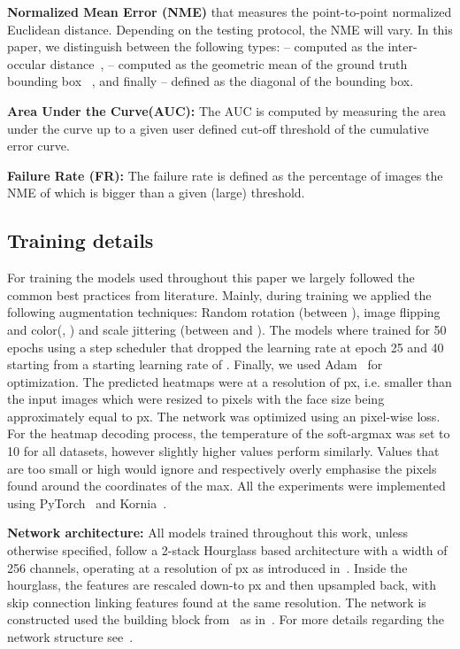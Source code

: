 \documentclass{bmvc2k}
\begin{document}
\noindent\textbf{Normalized Mean Error (NME)} that measures the point-to-point normalized Euclidean distance. Depending on the testing protocol, the NME  will vary. In this paper, we distinguish between the following types:   -- computed as the inter-occular distance~\cite{sagonas2013300},  -- computed as the geometric mean of the ground truth bounding box~\cite{bulat2017far} , and finally  -- defined as the diagonal of the bounding box.

\noindent\textbf{Area Under the Curve(AUC):} The AUC is computed by measuring the area under the curve up to a given user defined cut-off threshold of the cumulative error curve.

\noindent\textbf{Failure Rate (FR):} The failure rate is defined as the percentage of images the NME of which is bigger than a given (large) threshold.

\subsection{Training details}\label{ssec:training-details}
For training the models used throughout this paper we largely followed the common best practices from literature. Mainly, during training we applied the following augmentation techniques: Random rotation (between ), image flipping and color(, ) and scale jittering (between  and ). The models where trained for 50 epochs using a step scheduler that dropped the learning rate at epoch 25 and 40 starting from a starting learning rate of . Finally, we used Adam~\cite{kingma2014adam} for optimization. 
The predicted heatmaps were at a resolution of px, i.e.  smaller than the input images which were resized to  pixels with the face size being approximately equal to px. The network was optimized using an  pixel-wise loss. For the heatmap decoding process, the temperature of the soft-argmax  was set to 10 for all datasets, however slightly higher values perform similarly. Values that are too small or high would ignore and respectively overly emphasise the pixels found around the coordinates of the max.
All the experiments were implemented using PyTorch~\cite{NEURIPS2019_9015} and Kornia~\cite{riba2020kornia}.

\noindent\textbf{Network architecture:} All models trained throughout this work, unless otherwise specified, follow a 2-stack Hourglass based architecture with a width of 256 channels, operating at a resolution of px as introduced in~\cite{bulat2017far}. Inside the hourglass, the features are rescaled down-to px and then upsampled back, with skip connection linking features found at the same resolution. The network is constructed used the building block from~\cite{bulat2017binarized} as in~\cite{bulat2017far}.  For more details regarding the network structure see~\cite{newell2016stacked,bulat2017far}.
\end{document}
